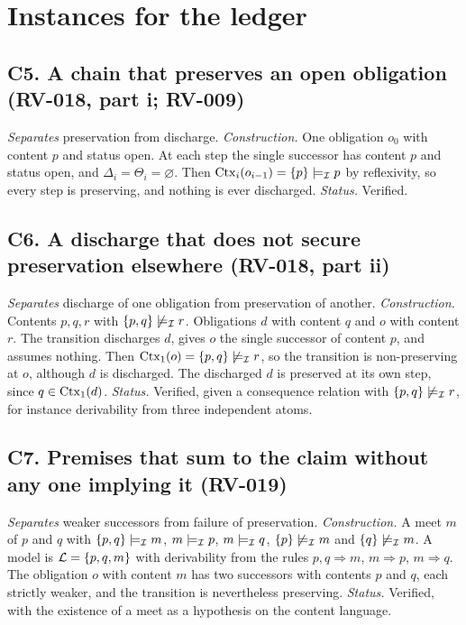 \section{Instances for the ledger}

\subsection*{C5. A chain that preserves an open obligation (RV-018, part i; RV-009)}

\emph{Separates} preservation from discharge. \emph{Construction.} One obligation $o_0$ with content $p$ and status open. At each step the single successor has content $p$ and status open, and $\Delta_i=\Theta_i=\varnothing$. Then $\operatorname{Ctx}_i(o_{i-1})=\{p\}\models_{\mathcal{I}} p$ by reflexivity, so every step is preserving, and nothing is ever discharged. \emph{Status.} Verified.

\subsection*{C6. A discharge that does not secure preservation elsewhere (RV-018, part ii)}

\emph{Separates} discharge of one obligation from preservation of another. \emph{Construction.} Contents $p,q,r$ with $\{p,q\}\not\models_{\mathcal{I}} r$. Obligations $d$ with content $q$ and $o$ with content $r$. The transition discharges $d$, gives $o$ the single successor of content $p$, and assumes nothing. Then $\operatorname{Ctx}_1(o)=\{p,q\}\not\models_{\mathcal{I}} r$, so the transition is non-preserving at $o$, although $d$ is discharged. The discharged $d$ is preserved at its own step, since $q\in\operatorname{Ctx}_1(d)$. \emph{Status.} Verified, given a consequence relation with $\{p,q\}\not\models_{\mathcal{I}} r$, for instance derivability from three independent atoms.

\subsection*{C7. Premises that sum to the claim without any one implying it (RV-019)}

\emph{Separates} weaker successors from failure of preservation. \emph{Construction.} A meet $m$ of $p$ and $q$ with $\{p,q\}\models_{\mathcal{I}} m$, $m\models_{\mathcal{I}} p$, $m\models_{\mathcal{I}} q$, $\{p\}\not\models_{\mathcal{I}} m$ and $\{q\}\not\models_{\mathcal{I}} m$. A model is $\mathcal{L}=\{p,q,m\}$ with derivability from the rules $p,q\Rightarrow m$, $m\Rightarrow p$, $m\Rightarrow q$. The obligation $o$ with content $m$ has two successors with contents $p$ and $q$, each strictly weaker, and the transition is nevertheless preserving. \emph{Status.} Verified, with the existence of a meet as a hypothesis on the content language.

